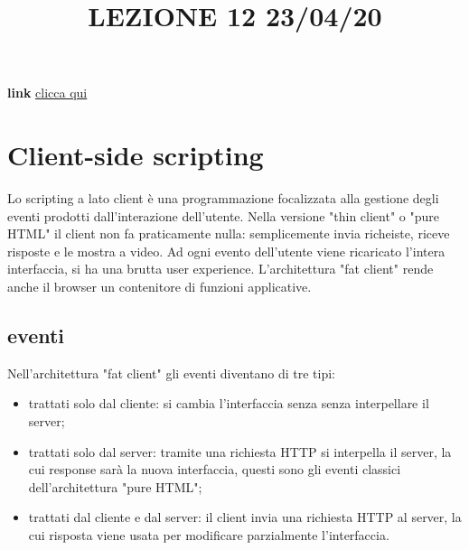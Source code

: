 \title{LEZIONE 12 23/04/20}
\textbf{link} \href{https://web.microsoftstream.com/video/55f4d4bd-8efe-48d2-870d-78b0a6baa77d?list=user&userId=cfe0965d-9a7c-40e2-be6e-f078296a1914}{clicca qui}
\section{Client-side scripting}
Lo scripting a lato client è una programmazione focalizzata alla gestione degli eventi prodotti dall'interazione dell'utente.\newline
\newline
Nella versione "thin client" o "pure HTML" il client non fa praticamente nulla: semplicemente invia richeiste, riceve risposte e le mostra a video. Ad ogni evento dell'utente viene ricaricato l'intera interfaccia, si ha una brutta user experience.\newline
\newline
L'architettura "fat client" rende anche il browser un contenitore di funzioni applicative. 
\subsection{eventi}
Nell'architettura "fat client" gli eventi diventano di tre tipi:
\begin{itemize}
    \item trattati solo dal cliente: si cambia l'interfaccia senza senza interpellare il server;
    \item trattati solo dal server: tramite una richiesta HTTP si interpella il server, la cui response sarà la nuova interfaccia, questi sono gli eventi classici dell'architettura "pure HTML";
    \item trattati dal cliente e dal server: il client invia una richiesta HTTP al server, la cui risposta viene usata per modificare parzialmente l'interfaccia.
\end{itemize}

